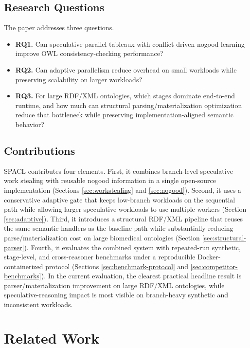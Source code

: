 \documentclass[preprint,12pt,times]{elsarticle}
\begin{document}
\subsection{Research Questions}
\label{sec:questions}

The paper addresses three questions.
\begin{itemize}
    \item \textbf{RQ1.} Can speculative parallel tableaux with conflict-driven nogood learning improve OWL consistency-checking performance?
    \item \textbf{RQ2.} Can adaptive parallelism reduce overhead on small workloads while preserving scalability on larger workloads?
    \item \textbf{RQ3.} For large RDF/XML ontologies, which stages dominate end-to-end runtime, and how much can structural parsing/materialization optimization reduce that bottleneck while preserving implementation-aligned semantic behavior?
\end{itemize}

\subsection{Contributions}
\label{sec:contributions}

SPACL contributes four elements. First, it combines branch-level speculative work stealing with reusable nogood information in a single open-source implementation (Sections \ref{sec:workstealing} and \ref{sec:nogood}). Second, it uses a conservative adaptive gate that keeps low-branch workloads on the sequential path while allowing larger speculative workloads to use multiple workers (Section \ref{sec:adaptive}). Third, it introduces a structural RDF/XML pipeline that reuses the same semantic handlers as the baseline path while substantially reducing parse/materialization cost on large biomedical ontologies (Section \ref{sec:structural-parser}). Fourth, it evaluates the combined system with repeated-run synthetic, stage-level, and cross-reasoner benchmarks under a reproducible Docker-containerized protocol (Sections \ref{sec:benchmark-protocol} and \ref{sec:competitor-benchmarks}). In the current evaluation, the clearest practical headline result is parser/materialization improvement on large RDF/XML ontologies, while speculative-reasoning impact is most visible on branch-heavy synthetic and inconsistent workloads.

\section{Related Work}
\label{sec:related}
\end{document}
